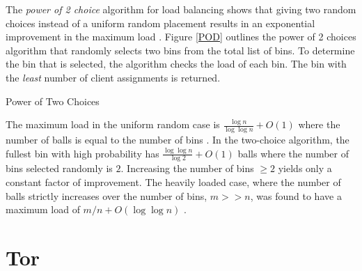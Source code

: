 The \emph{power of 2 choice} algorithm for load balancing shows that giving two random choices instead of a uniform random placement results in an exponential improvement in the maximum load \cite{mitzenmacher1996power}. Figure \ref{POD} outlines the power of 2 choices algorithm that randomly selects two bins from the total list of bins. To determine the bin that is selected, the algorithm checks the load of each bin. The bin with the \emph{least} number of client assignments is returned. 

\begin{algorithm}[t]
\DontPrintSemicolon
{}
\caption{Power of Two Choices \label{POD}}
\end{algorithm}

The maximum load in the uniform random case is $\frac{\log n}{\log \log n} + O(1)$ where the number of balls is equal to the number of bins \cite{azar1999balanced}. In the two-choice algorithm, the fullest bin with high probability has $ \frac{\log \log n}{\log 2} + O(1)$ balls where the number of bins selected randomly is $2$. Increasing the number of bins $\geq 2$ yields only a constant factor of improvement. The heavily loaded case, where the number of balls strictly increases over the number of bins, $m >> n$, was found to have a maximum load of $m/n + O(\log{\log{n}})$ \cite{berenbrink2000balanced}. \\

\section{Tor} 

